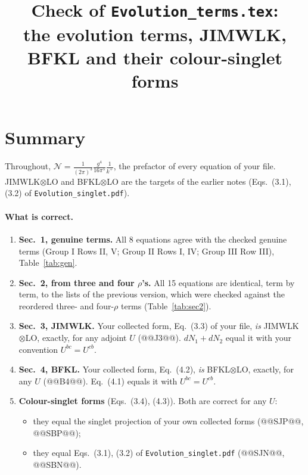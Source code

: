 \documentclass[10pt]{article}
\title{Check of \texttt{Evolution\_terms.tex}:\\ the evolution terms, JIMWLK, BFKL and their colour-singlet forms}
\date{}
\numberwithin{equation}{section}
\newcommand{\NN}{\mathcal N}
\begin{document}
\maketitle
\tableofcontents

\section{Summary}\label{sec:summary}
Throughout, $\NN=\frac{1}{(2\pi)^3}\frac{g^4}{16\pi^5}\frac{1}{k^+}$, the prefactor of every equation of your file. JIMWLK$\otimes$LO and BFKL$\otimes$LO are the targets of the earlier notes (Eqs.~(3.1), (3.2) of \texttt{Evolution\_singlet.pdf}).

\paragraph{What is correct.}
\begin{enumerate}
\item \textbf{Sec.~1, genuine terms.} All 8 equations agree with the checked genuine terms (Group I Rows II, V; Group II Rows I, IV; Group III Row III), Table~\ref{tab:gen}.
\item \textbf{Sec.~2, from three and four $\rho$'s.} All 15 equations are identical, term by term, to the lists of the previous version, which were checked against the reordered three- and four-$\rho$ terms (Table~\ref{tab:sec2}).
\item \textbf{Sec.~3, JIMWLK.} Your collected form, Eq.~(3.3) of your file, \emph{is} JIMWLK$\otimes$LO, exactly, for any adjoint $U$ (@@J3@@). $dN_1+dN_2$ equal it with your convention $U^{bc}=U^{cb}$.
\item \textbf{Sec.~4, BFKL.} Your collected form, Eq.~(4.2), \emph{is} BFKL$\otimes$LO, exactly, for any $U$ (@@B4@@). Eq.~(4.1) equals it with $U^{bc}=U^{cb}$.
\item \textbf{Colour-singlet forms} (Eqs.~(3.4), (4.3)). Both are correct for any $U$:
\begin{itemize}
\item they equal the singlet projection of your own collected forms (@@SJP@@, @@SBP@@);
\item they equal Eqs.~(3.1), (3.2) of \texttt{Evolution\_singlet.pdf} (@@SJN@@, @@SBN@@).
\end{itemize}
\end{enumerate}
\end{document}
